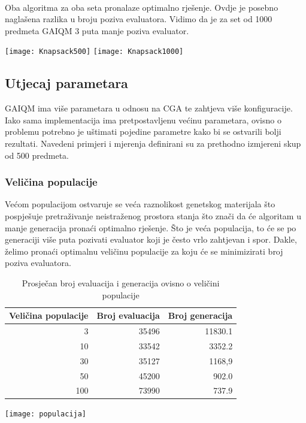 \documentclass[times, utf8, zavrsni, numeric]{fer}
\begin{document}
\paragraph{}
Oba algoritma za oba seta pronalaze optimalno rješenje. Ovdje je posebno naglašena razlika u broju poziva evaluatora. Vidimo da je za set od 1000 predmeta GAIQM 3 puta manje poziva evaluator.
\begin{center}
\texttt{[image: Knapsack500]} \hspace{15mm}
\texttt{[image: Knapsack1000]}
\end{center}

\subsection{Utjecaj parametara}
GAIQM ima više parametara u odnosu na CGA te zahtjeva više konfiguracije. Iako sama implementacija ima pretpostavljenu većinu parametara, ovisno o problemu potrebno je uštimati pojedine parametre kako bi se ostvarili bolji rezultati. Navedeni primjeri i mjerenja definirani su za prethodno izmjereni skup od 500 predmeta.

\subsubsection{Veličina populacije}
Većom populacijom ostvaruje se veća raznolikost genetskog materijala što pospješuje pretraživanje neistraženog prostora stanja što znači da će algoritam u manje generacija pronaći optimalno rješenje. Što je veća populacija, to će se po generaciji više puta pozivati evaluator koji je često vrlo zahtjevan i spor. Dakle, želimo pronaći optimalnu veličinu populacije za koju će se minimizirati broj poziva evaluatora.

\begin{table}[htb]
\caption{Prosječan broj evaluacija i generacija ovisno o veličini populacije}
\centering
\begin{tabular}{rrr} \hline
Veličina populacije & Broj evaluacija & Broj generacija \\ 
\hline
3 &	35496 &	11830.1 \\
10	 & 33542 &	3352.2 \\
30 &	35127 &	1168,9 \\
50	 & 45200 &	902.0 \\
100 &	73990 &	737.9 \\
\hline
\end{tabular}
\end{table}
\begin{center}
\texttt{[image: populacija]}
\end{center}
\end{document}
